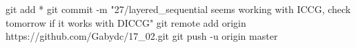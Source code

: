 git add *
git commit -m "27/layered_sequential seems working with ICCG, check tomorrow if it works with DICCG"
git remote add origin https://github.com/Gabydc/17_02.git
git push -u origin master
